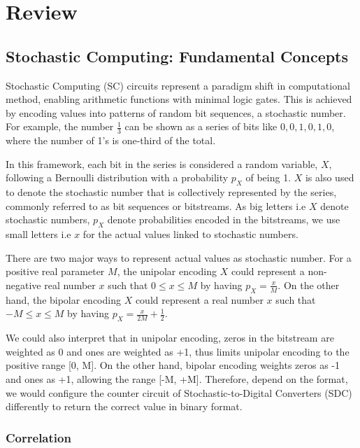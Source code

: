 %
\chapter{Review}
\label{sec:review}

\section{Stochastic Computing: Fundamental Concepts}
\label{sec:review:sec1}

Stochastic Computing (SC) circuits represent a paradigm shift in computational method, enabling arithmetic functions with minimal logic gates. This is achieved by  encoding values into patterns of random bit sequences, a stochastic number. For example, the number $\frac{1}{3}$ can be shown as a series of bits like $0, 0, 1, 0, 1, 0$, where the number of 1's is one-third of the total.

In this framework, each bit in the series is considered a random variable, $X$, following a Bernoulli distribution with a probability $p_X$ of being 1. $X$ is also used to denote the stochastic number that is collectively represented by the series, commonly referred to as bit sequences or bitstreams. As big letters i.e $X$ denote stochastic numbers, $p_X$ denote probabilities encoded in the bitstreams, we use small letters i.e $x$ for the actual values linked to stochastic numbers.

There are two major ways to represent actual values as stochastic number. For a positive real parameter $M$, the unipolar encoding $X$ could represent a non-negative real number $x$ such that $0 \leq x \leq M$ by having $p_X = \frac{x}{M} $. On the other hand, the bipolar encoding $X$ could represent a real number $x$ such that $-M \leq x \leq M$ by having $p_X  = \frac{x}{2M} + \frac{1}{2}$.

We could also interpret that in unipolar encoding, zeros in the bitstream are weighted as 0 and ones are weighted as +1, thus limits unipolar encoding to the positive range [0, M]. On the other hand, bipolar encoding weights zeros as -1 and ones as +1, allowing the range [-M, +M]. Therefore, depend on the format, we would configure the counter circuit of Stochastic-to-Digital Converters (SDC) differently to return the correct value in binary format. 


\subsection {Correlation}

